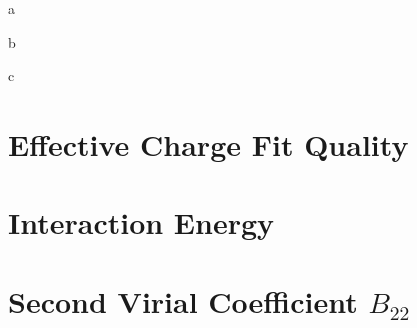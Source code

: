 \documentclass[landscape]{sciposter}
\begin{document}
\begin{multicols}{3}

  a

  \columnbreak

  b

  \columnbreak

  c

\end{multicols}



\begin{multicols}{3}


\section*{Effective Charge Fit Quality}
%

%
\vfill
\columnbreak

\section*{Interaction Energy}
%
%
\vfill
\columnbreak

\section*{Second Virial Coefficient $B_{22}$}
%

%
\vfill
\end{multicols}




 
\end{document}
